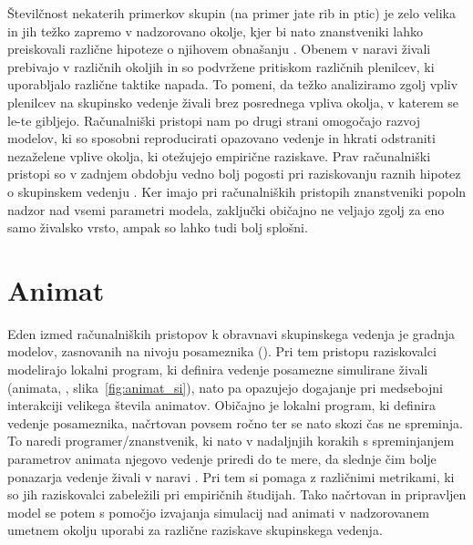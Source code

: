 \begin{razsirjeniPovzetek}
Številčnost nekaterih primerkov skupin (na primer jate rib in ptic) je zelo velika in jih težko zapremo v nadzorovano okolje, kjer bi nato znanstveniki lahko preiskovali različne hipoteze o njihovem obnašanju \cite{lebarbajec2009organized}. Obenem v naravi živali prebivajo v različnih okoljih in so podvržene pritiskom različnih plenilcev, ki uporabljalo različne taktike napada. To pomeni, da težko analiziramo zgolj vpliv plenilcev na skupinsko vedenje živali brez posrednega vpliva okolja, v katerem se le-te gibljejo. Računalniški pristopi nam po drugi strani omogočajo razvoj modelov, ki so sposobni reproducirati opazovano vedenje in hkrati odstraniti nezaželene vplive okolja, ki otežujejo empirične raziskave. Prav računalniški pristopi so v zadnjem obdobju vedno bolj pogosti pri raziskovanju raznih hipotez o skupinskem vedenju \cite{vicsek1995novel,couzin2002collective,hildenbrandt2010selforganized}. Ker imajo pri računalniških pristopih znanstveniki popoln nadzor nad vsemi parametri modela, zaključki običajno ne veljajo zgolj za eno samo živalsko vrsto, ampak so lahko tudi bolj splošni.

\section{Animat}

Eden izmed računalniških pristopov k obravnavi skupinskega vedenja je gradnja modelov, zasnovanih na nivoju posameznika (). Pri tem pristopu raziskovalci modelirajo lokalni program, ki definira vedenje posamezne simulirane živali (animata,  \cite{cliff1993adding,fine2013unifying,lebarbajec2005fuzzy,watts1998animats,wilson1985knowledge}, slika~\ref{fig:animat_si}), nato pa opazujejo dogajanje pri medsebojni interakciji velikega števila animatov. Običajno je lokalni program, ki definira vedenje posameznika, načrtovan povsem ročno ter se nato skozi čas ne spreminja. To naredi programer/znanstvenik, ki nato v nadaljnjih korakih s spreminjanjem parametrov animata njegovo vedenje priredi do te mere, da slednje čim bolje ponazarja vedenje živali v naravi \cite{couzin2002collective,demsar2014simulated,demsar2015simulating,lebarbajec2005fuzzy,lebarbajec2005simulating,hildenbrandt2010selforganized,vicsek1995novel}. Pri tem si pomaga z različnimi metrikami, ki so jih raziskovalci zabeležili pri empiričnih študijah. Tako načrtovan in pripravljen model se potem s pomočjo izvajanja simulacij nad animati v nadzorovanem umetnem okolju uporabi za različne raziskave skupinskega vedenja.


\end{razsirjeniPovzetek}
